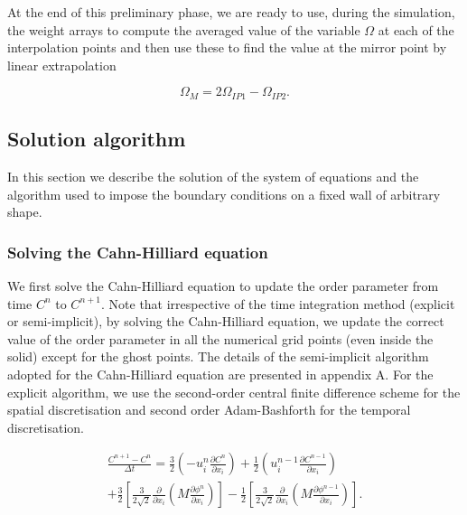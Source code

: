 \documentclass[review]{elsarticle}
\begin{document}
At the end of this preliminary phase, we are ready to use, during the simulation, the weight arrays to compute the averaged value of the variable $\Omega$ at each of the interpolation points and then use these to find the value at the mirror point by linear extrapolation
\begin{linenomath}\begin{equation} \label{extrapolation}
\Omega_M = 2\Omega_{IP1}-\Omega_{IP2}.
\end{equation}\end{linenomath}

\subsection{Solution algorithm}
In this section we describe the solution of the system of equations and the algorithm used to impose the boundary conditions on a fixed wall of arbitrary shape.

\subsubsection{Solving the Cahn-Hilliard equation} \label{SolviingCahnHilliard}
We first solve the Cahn-Hilliard equation to update the order parameter from time $C^n$ to $C^{n+1}$. Note that irrespective of the time integration method (explicit or semi-implicit), by solving the Cahn-Hilliard equation, we update the correct value of the order parameter in all the numerical grid points (even inside the solid) except for the ghost points. The details of the semi-implicit algorithm adopted for the Cahn-Hilliard equation are presented in appendix A. For the explicit algorithm, we use the second-order central finite difference scheme for the spatial discretisation and  second order Adam-Bashforth for the temporal discretisation.
\begin{linenomath}\begin{equation} \label{ExpCH} 
\begin{gathered}
\frac{C^{n+1}-C^n}{\Delta t} = \frac{3}{2} \left( -u_i^n \frac{\partial C^n}{\partial x_i}\right)+\frac{1}{2} \left(u_i^{n-1} \frac{\partial C^{n-1}}{\partial x_i}\right)\\
+\frac{3}{2}\left[ \frac{3}{2\sqrt{2}} \frac{\partial}{\partial x_i} \left( M\frac{\partial \phi^n}{\partial x _i} \right) \right]-\frac{1}{2}\left[ \frac{3}{2\sqrt{2}} \frac{\partial}{\partial x_i} \left( M\frac{\partial \phi^{n-1}}{\partial x _i} \right) \right].
\end{gathered}
\end{equation}\end{linenomath}
 
\end{document}
